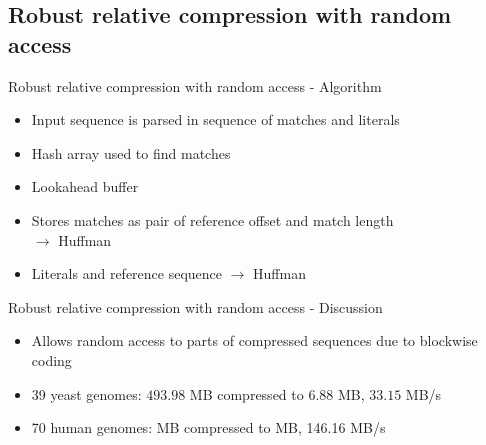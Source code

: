 \documentclass[aspectratio=1610]{beamer}
\begin{document}
\subsection{Robust relative compression with random access}%
\begin{frame}{Robust relative compression with random access - Algorithm}
  \begin{itemize}
    \item Input sequence is parsed in sequence of matches and literals 
    \item Hash array used to find matches
    \item Lookahead buffer %
    \item Stores matches as pair of reference offset and match length\\ $\rightarrow$ Huffman
    \item Literals and reference sequence $\rightarrow$ Huffman%
  \end{itemize}
\end{frame}

\begin{frame}{Robust relative compression with random access - Discussion}
  \begin{itemize}
    \item Allows random access to parts of compressed sequences due to blockwise coding
    \item 39 yeast genomes: $493.98$ MB compressed to $6.88$ MB, $33.15$ MB/s
  \item 70 human genomes:  MB compressed to MB, 146.16 MB/s
  \end{itemize}
\end{frame}
\end{document}
